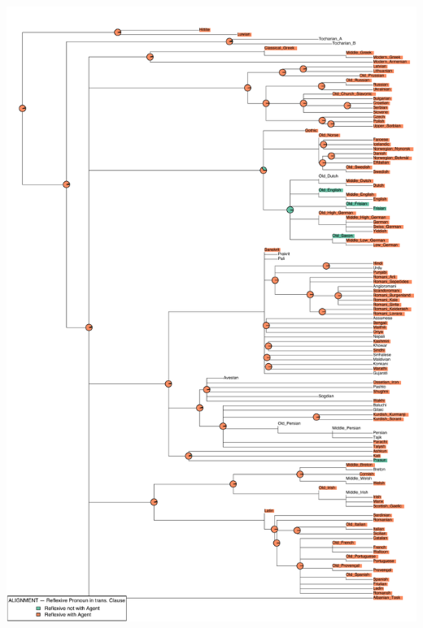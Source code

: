 \includegraphics[width=.9\linewidth]{supp-graphics/ALIGNMENTReflexivePronounintransClauseREFLrefA.pdf}

